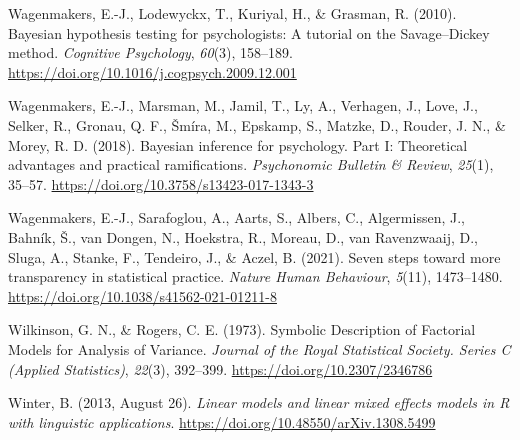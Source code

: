 \documentclass[
  doc,12pt,floatsintext]{apa7}
\newlength{\cslhangindent}
\newenvironment{CSLReferences}[2] %
 {\begin{list}{}{%
  \setlength{\itemindent}{0pt}
  \setlength{\leftmargin}{0pt}
  \setlength{\parsep}{0pt}
  \ifodd #1
   \setlength{\leftmargin}{\cslhangindent}
   \setlength{\itemindent}{-1\cslhangindent}
  \fi
  \setlength{\itemsep}{#2\baselineskip}}}
 {\end{list}}
\begin{document}
\begin{CSLReferences}{1}{0}
Wagenmakers, E.-J., Lodewyckx, T., Kuriyal, H., \& Grasman, R. (2010). Bayesian hypothesis testing for psychologists: {A} tutorial on the {Savage}--{Dickey} method. \emph{Cognitive Psychology}, \emph{60}(3), 158--189. \url{https://doi.org/10.1016/j.cogpsych.2009.12.001}

Wagenmakers, E.-J., Marsman, M., Jamil, T., Ly, A., Verhagen, J., Love, J., Selker, R., Gronau, Q. F., Šmíra, M., Epskamp, S., Matzke, D., Rouder, J. N., \& Morey, R. D. (2018). Bayesian inference for psychology. {Part I}: {Theoretical} advantages and practical ramifications. \emph{Psychonomic Bulletin \& Review}, \emph{25}(1), 35--57. \url{https://doi.org/10.3758/s13423-017-1343-3}

Wagenmakers, E.-J., Sarafoglou, A., Aarts, S., Albers, C., Algermissen, J., Bahník, Š., van Dongen, N., Hoekstra, R., Moreau, D., van Ravenzwaaij, D., Sluga, A., Stanke, F., Tendeiro, J., \& Aczel, B. (2021). Seven steps toward more transparency in statistical practice. \emph{Nature Human Behaviour}, \emph{5}(11), 1473--1480. \url{https://doi.org/10.1038/s41562-021-01211-8}

Wilkinson, G. N., \& Rogers, C. E. (1973). Symbolic {Description} of {Factorial Models} for {Analysis} of {Variance}. \emph{Journal of the Royal Statistical Society. Series C (Applied Statistics)}, \emph{22}(3), 392--399. \url{https://doi.org/10.2307/2346786}

Winter, B. (2013, August 26). \emph{Linear models and linear mixed effects models in {R} with linguistic applications}. \url{https://doi.org/10.48550/arXiv.1308.5499}

\end{CSLReferences}

\newpage



\end{document}

